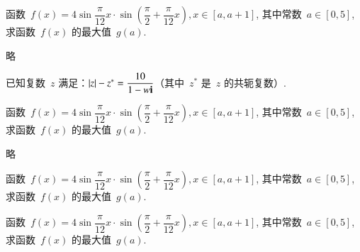 \documentclass[marginline,answers]{BHCexam}
\begin{document}
\begin{questions}
\jiandab
\question[16] 函数~$f(x)=4\sin\dfrac{\pi}{12}x\cdot\sin
    \left(\dfrac{\pi}{2}+\dfrac{\pi}{12}x\right),x\in[a,a+1]$,
    其中常数~$a\in[0,5]$, 求函数~$f(x)$ 的最大值~$g(a)$.

\begin{solution}
略
\end{solution}


\question 已知复数~$z$ 满足：$\left| z \right|-z^*=\dfrac{10}{1-w\textbf{i}}$（其中~$z^*$
是~$z$ 的共轭复数）.

\begin{solution}
\end{solution}


\jiandac
\question[18] 函数~$f(x)=4\sin\dfrac{\pi}{12}x\cdot\sin
    \left(\dfrac{\pi}{2}+\dfrac{\pi}{12}x\right),x\in[a,a+1]$,
    其中常数~$a\in[0,5]$, 求函数~$f(x)$ 的最大值~$g(a)$.

\begin{solution}
略
\end{solution}

\question[18] 函数~$f(x)=4\sin\dfrac{\pi}{12}x\cdot\sin
\left(\dfrac{\pi}{2}+\dfrac{\pi}{12}x\right),x\in[a,a+1]$,
其中常数~$a\in[0,5]$, 求函数~$f(x)$ 的最大值~$g(a)$.

\jiandad
\question 函数~$f(x)=4\sin\dfrac{\pi}{12}x\cdot\sin
\left(\dfrac{\pi}{2}+\dfrac{\pi}{12}x\right),x\in[a,a+1]$,
其中常数~$a\in[0,5]$, 求函数~$f(x)$ 的最大值~$g(a)$.


\end{questions}
\end{document}
